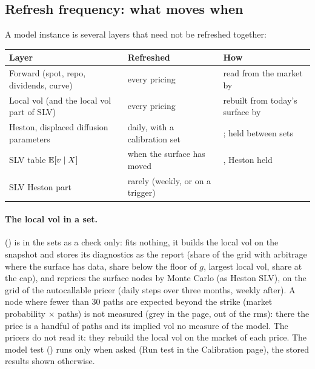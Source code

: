 \subsection{Refresh frequency: what moves when}\label{sec:arch-calibration-frequency}
A model instance is several layers that need not be refreshed together:
\begin{center}
\small
\begin{tabular}{@{}L{4.2cm}L{4.2cm}L{6.8cm}@{}}
\toprule
Layer & Refreshed & How \\
\midrule
Forward (spot, repo, dividends, curve) & every pricing & read from the market by  \\
Local vol (and the local vol part of SLV) & every pricing & rebuilt from today's surface by  \\
Heston, displaced diffusion parameters & daily, with a calibration set & ; held between sets \\
SLV table $\mathbb{E}[v \mid X]$ & when the surface has moved & , Heston held \\
SLV Heston part & rarely (weekly, or on a trigger) &  \\
\bottomrule
\end{tabular}
\end{center}
\paragraph{The local vol in a set.}  () is in the sets as a check only:
 fits nothing, it builds the local vol on the snapshot and stores its diagnostics as the report
(share of the grid with arbitrage where the surface has data, share below the floor of $g$, largest local vol, share
at the cap), and  reprices the surface nodes by Monte Carlo (as Heston SLV), on the grid of the autocallable
pricer (daily steps over three months, weekly after). A node where fewer than 30 paths are expected beyond the
strike (market probability $\times$ paths) is not measured (grey in the page, out of the rms): there the price is a
handful of paths and its implied vol no measure of the model. The pricers do not
read it: they rebuild the local vol on the market of each price. The model test () runs only when
asked (Run test in the Calibration page), the stored results shown otherwise.

